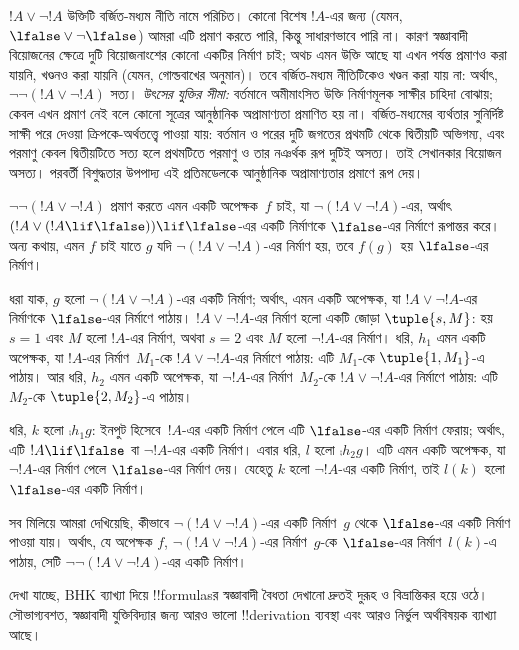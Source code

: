 \documentclass[../../../include/open-logic-section]{subfiles}
\begin{document}
$!A \lor \lnot !A$ উক্তিটি বর্জিত-মধ্যম নীতি নামে পরিচিত। কোনো
বিশেষ $!A$-এর জন্য (যেমন, $\lfalse \lor
\lnot \lfalse$) আমরা এটি প্রমাণ করতে পারি, কিন্তু সাধারণভাবে
পারি না। কারণ স্বজ্ঞাবাদী বিয়োজনের ক্ষেত্রে দুটি বিয়োজনাংশের
কোনো একটির নির্মাণ চাই; অথচ এমন উক্তি আছে যা এখন পর্যন্ত প্রমাণও
করা যায়নি, খণ্ডনও করা যায়নি (যেমন, গোল্ডবাখের অনুমান)। তবে
বর্জিত-মধ্যম নীতিটিকেও খণ্ডন করা যায় না: অর্থাৎ, $\lnot \lnot (!A
\lor \lnot !A)$ সত্য।
\emph{উৎসের যুক্তির সীমা:} বর্তমানে অমীমাংসিত উক্তি নির্মাণমূলক সাক্ষীর চাহিদা বোঝায়; কেবল এখন প্রমাণ নেই বলে কোনো সূত্রের আনুষ্ঠানিক অপ্রামাণ্যতা প্রমাণিত হয় না। বর্জিত-মধ্যমের ব্যর্থতার সুনির্দিষ্ট সাক্ষী পরে দেওয়া ক্রিপকে-অর্থতত্ত্বে পাওয়া যায়: বর্তমান ও পরের দুটি জগতের প্রথমটি থেকে দ্বিতীয়টি অভিগম্য, এবং পরমাণু কেবল দ্বিতীয়টিতে সত্য হলে প্রথমটিতে পরমাণু ও তার নঞর্থক রূপ দুটিই অসত্য। তাই সেখানকার বিয়োজন অসত্য। পরবর্তী বিশুদ্ধতার উপপাদ্য এই প্রতিমডেলকে আনুষ্ঠানিক অপ্রামাণ্যতার প্রমাণে রূপ দেয়।

\begin{ex}
$\lnot \lnot (!A \lor \lnot !A)$ প্রমাণ করতে এমন একটি অপেক্ষক~$f$
চাই, যা $\lnot(!A \lor \lnot !A)$-এর, অর্থাৎ $(!A
\lor (!A \lif \lfalse)) \lif \lfalse$-এর একটি নির্মাণকে
$\lfalse$-এর নির্মাণে রূপান্তর করে। অন্য কথায়, এমন $f$ চাই যাতে
$g$ যদি $\lnot(!A \lor \lnot !A)$-এর নির্মাণ হয়, তবে $f(g)$ হয়
$\lfalse$-এর নির্মাণ।

ধরা যাক, $g$ হলো $\lnot(!A \lor \lnot !A)$-এর একটি নির্মাণ; অর্থাৎ,
এমন একটি অপেক্ষক, যা $!A \lor \lnot !A$-এর নির্মাণকে $\lfalse$-এর
নির্মাণে পাঠায়। $!A \lor \lnot !A$-এর নির্মাণ হলো একটি জোড়া
$\tuple{s, M}$: হয় $s = 1$ এবং $M$ হলো $!A$-এর নির্মাণ, অথবা
$s = 2$ এবং $M$ হলো $\lnot !A$-এর নির্মাণ। ধরি, $h_1$ এমন একটি
অপেক্ষক, যা $!A$-এর নির্মাণ~$M_1$-কে $!A \lor \lnot !A$-এর নির্মাণে
পাঠায়:
এটি $M_1$-কে $\tuple{1, M_1}$-এ পাঠায়। আর ধরি, $h_2$ এমন একটি
অপেক্ষক, যা $\lnot !A$-এর নির্মাণ~$M_2$-কে $!A \lor \lnot !A$-এর
নির্মাণে পাঠায়: এটি $M_2$-কে $\tuple{2, M_2}$-এ পাঠায়।

ধরি, $k$ হলো $\comp{h_1}{g}$: ইনপুট হিসেবে~$!A$-এর একটি নির্মাণ
পেলে এটি $\lfalse$-এর একটি নির্মাণ ফেরায়; অর্থাৎ, এটি
$!A \lif \lfalse$ বা $\lnot !A$-এর একটি নির্মাণ। এবার ধরি,
$l$ হলো $\comp{h_2}{g}$। এটি এমন একটি অপেক্ষক, যা $\lnot !A$-এর
নির্মাণ পেলে $\lfalse$-এর নির্মাণ দেয়। যেহেতু $k$ হলো
$\lnot !A$-এর একটি নির্মাণ, তাই $l(k)$ হলো $\lfalse$-এর একটি নির্মাণ।

সব মিলিয়ে আমরা দেখিয়েছি, কীভাবে $\lnot(!A \lor \lnot !A)$-এর
একটি নির্মাণ~$g$ থেকে $\lfalse$-এর একটি নির্মাণ পাওয়া যায়। অর্থাৎ,
যে অপেক্ষক $f$, $\lnot(!A \lor \lnot !A)$-এর নির্মাণ~$g$-কে
$\lfalse$-এর নির্মাণ~$l(k)$-এ পাঠায়, সেটি
$\lnot\lnot(!A \lor \lnot !A)$-এর একটি নির্মাণ।
\end{ex}

দেখা যাচ্ছে, BHK ব্যাখ্যা দিয়ে !!{formula}sর স্বজ্ঞাবাদী
বৈধতা দেখানো দ্রুতই দুরূহ ও বিভ্রান্তিকর হয়ে ওঠে। সৌভাগ্যবশত,
স্বজ্ঞাবাদী যুক্তিবিদ্যার জন্য আরও ভালো !!{derivation} ব্যবস্থা
এবং আরও নির্ভুল অর্থবিষয়ক ব্যাখ্যা আছে।
\end{document}
